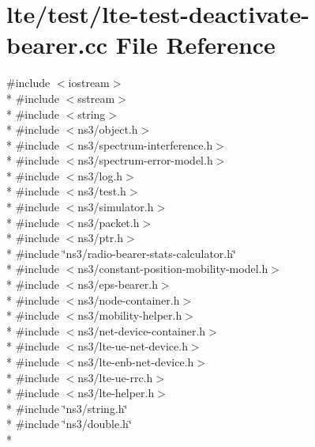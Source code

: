 \hypertarget{lte-test-deactivate-bearer_8cc}{}\section{lte/test/lte-\/test-\/deactivate-\/bearer.cc File Reference}
\label{lte-test-deactivate-bearer_8cc}
{\ttfamily \#include $<$iostream$>$}\\*
{\ttfamily \#include $<$sstream$>$}\\*
{\ttfamily \#include $<$string$>$}\\*
{\ttfamily \#include $<$ns3/object.\+h$>$}\\*
{\ttfamily \#include $<$ns3/spectrum-\/interference.\+h$>$}\\*
{\ttfamily \#include $<$ns3/spectrum-\/error-\/model.\+h$>$}\\*
{\ttfamily \#include $<$ns3/log.\+h$>$}\\*
{\ttfamily \#include $<$ns3/test.\+h$>$}\\*
{\ttfamily \#include $<$ns3/simulator.\+h$>$}\\*
{\ttfamily \#include $<$ns3/packet.\+h$>$}\\*
{\ttfamily \#include $<$ns3/ptr.\+h$>$}\\*
{\ttfamily \#include \char`\"{}ns3/radio-\/bearer-\/stats-\/calculator.\+h\char`\"{}}\\*
{\ttfamily \#include $<$ns3/constant-\/position-\/mobility-\/model.\+h$>$}\\*
{\ttfamily \#include $<$ns3/eps-\/bearer.\+h$>$}\\*
{\ttfamily \#include $<$ns3/node-\/container.\+h$>$}\\*
{\ttfamily \#include $<$ns3/mobility-\/helper.\+h$>$}\\*
{\ttfamily \#include $<$ns3/net-\/device-\/container.\+h$>$}\\*
{\ttfamily \#include $<$ns3/lte-\/ue-\/net-\/device.\+h$>$}\\*
{\ttfamily \#include $<$ns3/lte-\/enb-\/net-\/device.\+h$>$}\\*
{\ttfamily \#include $<$ns3/lte-\/ue-\/rrc.\+h$>$}\\*
{\ttfamily \#include $<$ns3/lte-\/helper.\+h$>$}\\*
{\ttfamily \#include \char`\"{}ns3/string.\+h\char`\"{}}\\*
{\ttfamily \#include \char`\"{}ns3/double.\+h\char`\"{}}\\*
